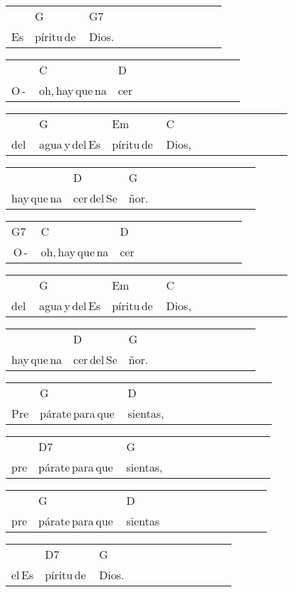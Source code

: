 \begin{multicols}{2}
\begin{minipage}{\columnwidth}
\noindent
\begin{tabular}{llllllllllll}
&G&G7\\
Es&píritu\,de\,&Dios.
\end{tabular}

\noindent
\begin{tabular}{llllllllllll}
&C&D\\
O\,-\,&oh,\,hay\,que\,na&cer
\end{tabular}

\noindent
\begin{tabular}{llllllllllll}
&G&Em&C\\
del\,&agua\,y\,del\,Es&píritu\,de\,&Dios,
\end{tabular}

\noindent
\begin{tabular}{llllllllllll}
&D&G\\
hay\,que\,na&cer\,del\,Se&ñor.
\end{tabular}

\noindent
\begin{tabular}{llllllllllll}
G7&C&D\\
\,O\,-\,&oh,\,hay\,que\,na&cer
\end{tabular}

\noindent
\begin{tabular}{llllllllllll}
&G&Em&C\\
del\,&agua\,y\,del\,Es&píritu\,de\,&Dios,
\end{tabular}

\noindent
\begin{tabular}{llllllllllll}
&D&G\\
hay\,que\,na&cer\,del\,Se&ñor.
\end{tabular}

\noindent
\begin{tabular}{llllllllllll}
&G&D\\
Pre&párate\,para\,que\,&sientas,
\end{tabular}

\noindent
\begin{tabular}{llllllllllll}
&D7&G\\
pre&párate\,para\,que\,&sientas,
\end{tabular}

\noindent
\begin{tabular}{llllllllllll}
&G&D\\
pre&párate\,para\,que\,&sientas
\end{tabular}

\noindent
\begin{tabular}{llllllllllll}
&D7&G\\
el\,Es&píritu\,de\,&Dios.
\end{tabular}


\end{minipage}
\end{multicols}
